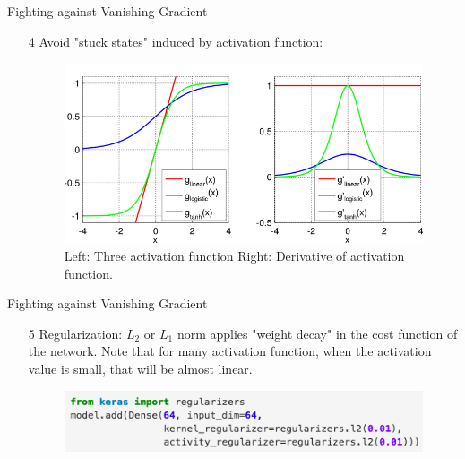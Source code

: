 \documentclass[xcolor=pdftex,dvipsnames,table,mathserif]{beamer}
\begin{document}
\begin{frame}{Fighting against Vanishing Gradient}
\begin{enumerate}
\item[4] Avoid "stuck states" induced by activation function: 
\begin{figure}
\includegraphics[width=.85 \columnwidth]{../graphics/nnet-error-functions2}
\caption{Left: Three activation function Right: Derivative of activation function.}
\end{figure}
\end{enumerate}
\end{frame}

\begin{frame}{Fighting against Vanishing Gradient}
\begin{enumerate}
\item[5] Regularization: $L_2$ or $L_1$ norm applies "weight decay" in the cost function of the network. Note that for many activation function, when the activation value is small, that will be almost linear.
\begin{figure}
\includegraphics[width=.75 \columnwidth]{../graphics/KerasRegularizer}
\end{figure}

\end{enumerate}
\end{frame}
\end{document}
